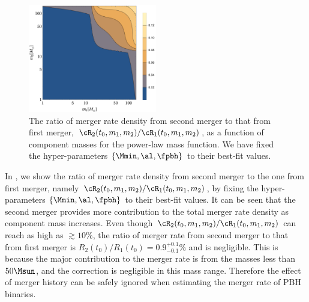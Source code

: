 \documentclass[twocolumn]{aastex631}
\begin{document}
\begin{figure}[htbp!]
	\centering
	\includegraphics[width=0.5\textwidth]{ratio-power.pdf}
	\caption{\label{ratio-power}The ratio of merger rate density from second merger to that from first merger, $\cR_2(t_0, m_1, m_2)/\cR_1(t_0, m_1, m_2)$, as a function of component masses for the power-law mass function. We have fixed the hyper-parameters $\{\Mmin, \al, \fpbh\}$ to their best-fit values.}
\end{figure}

In , we show the ratio of merger rate density from second merger to the one from first merger, namely $\cR_2(t_0, m_1, m_2)/\cR_1(t_0, m_1, m_2)$, by fixing the hyper-parameters $\{\Mmin, \al, \fpbh\}$ to their best-fit values. It can be seen that the second merger provides more contribution to the total merger rate density as component mass increases. Even though $\cR_2(t_0, m_1, m_2)/\cR_1(t_0, m_1, m_2)$ can reach as high as $\gtrsim 10\%$, the ratio of merger rate from second merger to that from first merger is $R_2(t_0)/R_1(t_0) = 0.9^{+0.1}_{-0.1}\%$ and is negligible. This is because the major contribution to the merger rate is from the masses less than $50\Msun$, and the correction is negligible in this mass range. Therefore the effect of merger history can be safely ignored when estimating the merger rate of PBH binaries.

\end{document}
